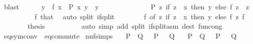 \begin{isabellebody}
\ blast\isanewline
\ \ \ \ \isamarkupfalse%
\ {\isachardoublequoteopen}y\ {\isacharequal}{\kern0pt}\ f\ x{\isachardoublequoteclose}\ \ {\isachardoublequoteopen}P\ x\ y{\isachardoublequoteclose}\ \ y\isanewline
\ \ \ \ \isamarkupfalse%
\ {\isacharminus}{\kern0pt}\isanewline
\ \ \ \ \ \ \isamarkupfalse%
\ {\isachardoublequoteopen}P\ z\ {\isacharparenleft}{\kern0pt}if\ z\ {\isacharequal}{\kern0pt}\ x\ then\ y\ else\ f\ z{\isacharparenright}{\kern0pt}{\isachardoublequoteclose}\ \ z\isanewline
\ \ \ \ \ \ \ \ \isamarkupfalse%
\ f\ that\ \isamarkupfalse%
\ {\isacharparenleft}{\kern0pt}auto\ split{\isacharcolon}{\kern0pt}\ if{\isacharunderscore}{\kern0pt}split{\isacharparenright}{\kern0pt}\isanewline
\ \ \ \ \ \ \isamarkupfalse%
\ f{}\ {\isacharbrackleft}{\kern0pt}of\ {\isachardoublequoteopen}{\isasymlambda}z{\isachardot}{\kern0pt}\ if\ z\ {\isacharequal}{\kern0pt}\ x\ then\ y\ else\ f\ z{\isachardoublequoteclose}{\isacharbrackright}{\kern0pt}\ f\isanewline
\ \ \ \ \ \ \isamarkupfalse%
\ {\isacharquery}{\kern0pt}thesis\isanewline
\ \ \ \ \ \ \ \ \isamarkupfalse%
\ {\isacharparenleft}{\kern0pt}auto\ simp\ add{\isacharcolon}{\kern0pt}\ split{\isacharcolon}{\kern0pt}\ if{\isacharunderscore}{\kern0pt}split{\isacharunderscore}{\kern0pt}asm\ dest{\isacharcolon}{\kern0pt}\ fun{\isacharunderscore}{\kern0pt}cong{\isacharparenright}{\kern0pt}\isanewline
\ \ \ \ \isamarkupfalse%
\isanewline
\ \ \isamarkupfalse%
\isanewline
{}\isamarkupfalse%
%
\endisatagproof
{\isafoldproof}%
%
\isadelimproof
\isanewline
%
\endisadelimproof
\isanewline
{}\isamarkupfalse%
\ eq{\isacharunderscore}{\kern0pt}sym{\isacharunderscore}{\kern0pt}conv\ {\isacharequal}{\kern0pt}\ eq{\isacharunderscore}{\kern0pt}commute\isanewline
\isanewline
{}\isamarkupfalse%
\ nnf{\isacharunderscore}{\kern0pt}simps{\isacharcolon}{\kern0pt}\isanewline
\ \ {\isachardoublequoteopen}{\isacharparenleft}{\kern0pt}{\isasymnot}\ {\isacharparenleft}{\kern0pt}P\ {\isasymand}\ Q{\isacharparenright}{\kern0pt}{\isacharparenright}{\kern0pt}\ {\isacharequal}{\kern0pt}\ {\isacharparenleft}{\kern0pt}{\isasymnot}\ P\ {\isasymor}\ {\isasymnot}\ Q{\isacharparenright}{\kern0pt}{\isachardoublequoteclose}\isanewline
\ \ {\isachardoublequoteopen}{\isacharparenleft}{\kern0pt}{\isasymnot}\ {\isacharparenleft}{\kern0pt}P\ {\isasymor}\ Q{\isacharparenright}{\kern0pt}{\isacharparenright}{\kern0pt}\ {\isacharequal}{\kern0pt}\ {\isacharparenleft}{\kern0pt}{\isasymnot}\ P\ {\isasymand}\ {\isasymnot}\ Q{\isacharparenright}{\kern0pt}{\isachardoublequoteclose}\isanewline

\end{isabellebody}
